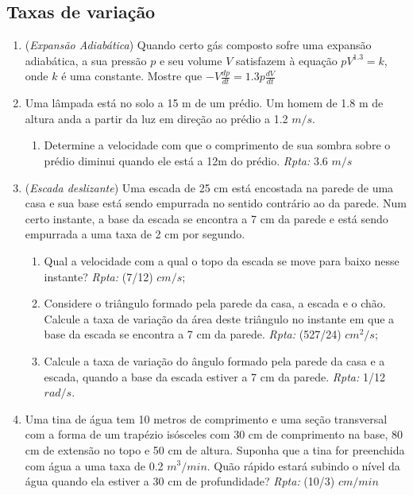\documentclass[latin,20pt]{article}
\begin{document}
    \subsection{Taxas de variação}   
    \begin{enumerate}
    \item 
     ({\it Expansão Adiabática}) 
     Quando certo gás composto sofre uma 
     expansão adiabática, a sua pressão 
     $p$ e seu volume $V$ 
     satisfazem à equação 
     $pV^{1.3}=k$, onde $k$ é uma constante. 
     Mostre que
     $-V\frac{dp}{dt}=1.3 p \frac{dV}{dt}$
     \item Uma lâmpada está no solo a 15 m de um prédio. 
     Um homem de 1.8 m de altura anda a partir da luz em
     direção ao prédio a 1.2 $m/s$. 
        \begin{enumerate}
        \item Determine a velocidade com que o comprimento de sua 
        sombra sobre o prédio diminui quando ele está a 12m do prédio. 
        {\it Rpta: } 3.6 $m/s$
        \end{enumerate}
     \item ({\it Escada deslizante}) 
     Uma escada de 25 cm está encostada na parede de uma casa e sua base está sendo
     empurrada no sentido contrário ao da parede. 
     Num certo instante, a base da escada se encontra a 7
     cm da parede e está sendo empurrada a uma taxa de 2 cm por segundo.
       \begin{enumerate}
       	\item Qual a velocidade com a qual o topo da escada se move para baixo nesse instante? {\it Rpta: } (7/12) $cm/s$;
       	\item Considere o triângulo formado pela parede da casa, a escada e o chão. Calcule a taxa de variação
       	da área deste triângulo no instante em que a base da escada se encontra a 7 cm da parede. {\it Rpta: } (527/24) $cm^{2}/s$;
       	\item Calcule a taxa de variação do ângulo formado 
       	pela parede da casa e a escada, quando a base da
       	escada estiver a 7 cm da parede. {\it Rpta: } 1/12 $rad/s$.
       \end{enumerate}
     \item Uma tina de água tem 10 metros de comprimento e uma seção transversal com a forma de um trapézio
     isósceles com 30 cm de comprimento na base, 80 cm de extensão no topo e 50 cm de altura. Suponha que a
     tina for preenchida com água a uma taxa de 0.2 $m^{3}/min$.
     Quão rápido estará subindo o nível da água
     quando ela estiver a 30 cm de profundidade? {\it Rpta:} 
     (10/3) $cm/min$
    \end{enumerate} 
\end{document}
